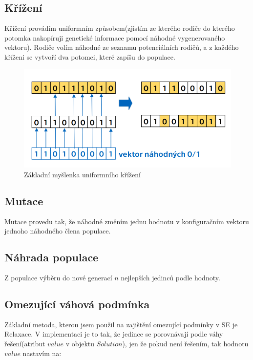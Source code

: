 \documentclass{article}
\begin{document}
\subsection{Křížení}   

Křížení provádím uniformním způsobem(zjistím ze kterého rodiče do kterého potomka nakopíruji genetické informace pomocí náhodné vygenerovaného vektoru). Rodiče volím náhodné ze seznamu potenciálních rodičů, a z každého kříženi se vytvoří dva potomci, které zapíšu do populace.

\begin{figure}[H]
    \centering
    \includegraphics[width=1\textwidth]{Screenshot_1228}
    \caption{Základní myšlenka uniformního křížení\cite{recomb_uni}}
    \label{fig:recomb_uniform}
\end{figure}

\subsection{Mutace}   

Mutace provedu tak, že náhodné změním jednu hodnotu v konfiguračním vektoru jednoho náhodného člena populace.

\subsection{Náhrada populace}

Z populace výběru do nové generací \(n\) nejlepších jedinců podle hodnoty.

\newpage
\subsection{Omezující váhová podmínka}

Základní metoda, kterou jsem použil na zajištění omezující podmínky v SE je Relaxace. V implementaci je to tak, že jedince se porovnávají podle váhy řešení(atribut \(value\) v objektu \(Solution\)), jen že pokud není řešením, tak hodnotu \(value\) nastavím na:
\end{document}
